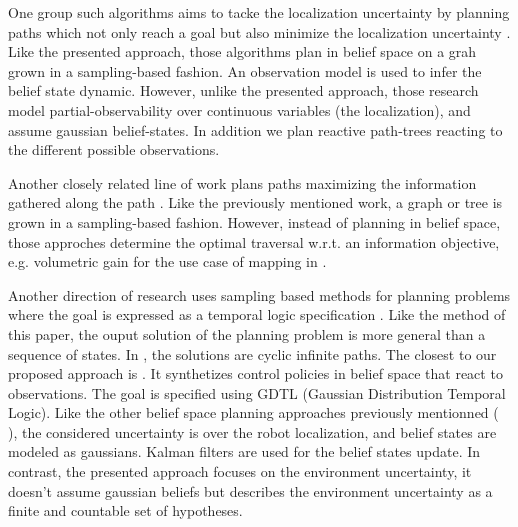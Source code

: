 \documentclass[letterpaper, 10 pt, conference]{ieeeconf}  %
\begin{document}
One group such algorithms aims to tacke the localization uncertainty by planning paths which not only reach a goal but also minimize the localization uncertainty \cite{prentice2010belief} \cite{bry2011rapidly}. Like the presented approach, those algorithms plan in belief space on a grah grown in a sampling-based fashion. An observation model is used to infer the belief state dynamic. However, unlike the presented approach, those research model partial-observability over continuous variables (the localization), and assume gaussian belief-states. In addition we plan reactive path-trees reacting to the different possible observations.

Another closely related line of work plans paths maximizing the information gathered along the path \cite{hollinger2014sampling} \cite{levine2010information} \cite{dang2020graph}. Like the previously mentioned work, a graph or tree is grown in a sampling-based fashion. However, instead of planning in belief space, those approches determine the optimal traversal w.r.t. an information objective, e.g. volumetric gain for the use case of mapping in \cite{dang2020graph}.


Another direction of research uses sampling based methods for planning problems where the goal is expressed as a temporal logic specification \cite{karaman2009sampling} \cite{leahy2019control} \cite{vasile2020reactive}. Like the method of this paper, the ouput solution of the planning problem is more general than a sequence of states. In \cite{karaman2009sampling} \cite{vasile2020reactive}, the solutions are cyclic infinite paths. The closest to our proposed approach is \cite{leahy2019control}. It synthetizes control policies in belief space that react to observations. The goal is specified using GDTL (Gaussian Distribution Temporal Logic). Like the other belief space planning approaches previously mentionned (\cite{prentice2010belief} \cite{bry2011rapidly}), the considered uncertainty is over the robot localization, and belief states are modeled as gaussians. Kalman filters are used for the belief states update. In contrast, the presented approach focuses on the environment uncertainty, it doesn't assume gaussian beliefs but describes the environment uncertainty as a finite and countable set of hypotheses.
\end{document}

